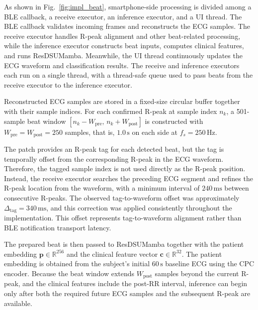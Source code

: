 As shown in Fig.~\ref{fig:impl_beat}, smartphone-side processing is divided among a BLE callback, a receive executor, an inference executor, and a UI thread.
The BLE callback validates incoming frames and reconstructs the ECG samples.
The receive executor handles R-peak alignment and other beat-related processing, while the inference executor constructs beat inputs, computes clinical features, and runs ResDSUMamba.
Meanwhile, the UI thread continuously updates the ECG waveform and classification results.
The receive and inference executors each run on a single thread, with a thread-safe queue used to pass beats from the receive executor to the inference executor.
 
Reconstructed ECG samples are stored in a fixed-size circular buffer together with their sample indices.
For each confirmed R-peak at sample index $n_k$, a 501-sample beat window $[n_k-W_{\mathrm{pre}},\,n_k+W_{\mathrm{post}}]$ is constructed with $W_{\mathrm{pre}}=W_{\mathrm{post}}=250$ samples, that is, $1.0\,\mathrm{s}$ on each side at $f_s=250\,\mathrm{Hz}$.
 
The patch provides an R-peak tag for each detected beat, but the tag is temporally offset from the corresponding R-peak in the ECG waveform.
Therefore, the tagged sample index is not used directly as the R-peak position.
Instead, the receive executor searches the preceding ECG segment and refines the R-peak location from the waveform, with a minimum interval of $240\,\mathrm{ms}$ between consecutive R-peaks.
The observed tag-to-waveform offset was approximately $\Delta_{\mathrm{tag}}=340\,\mathrm{ms}$, and this correction was applied consistently throughout the implementation.
This offset represents tag-to-waveform alignment rather than BLE notification transport latency.
 
The prepared beat is then passed to ResDSUMamba together with the patient embedding $\mathbf{p}\in\mathbb{R}^{256}$ and the clinical feature vector $\mathbf{c}\in\mathbb{R}^{32}$.
The patient embedding is obtained from the subject's initial $60\,\mathrm{s}$ baseline ECG using the CPC encoder.
Because the beat window extends $W_{\mathrm{post}}$ samples beyond the current R-peak, and the clinical features include the post-RR interval, inference can begin only after both the required future ECG samples and the subsequent R-peak are available.
 
